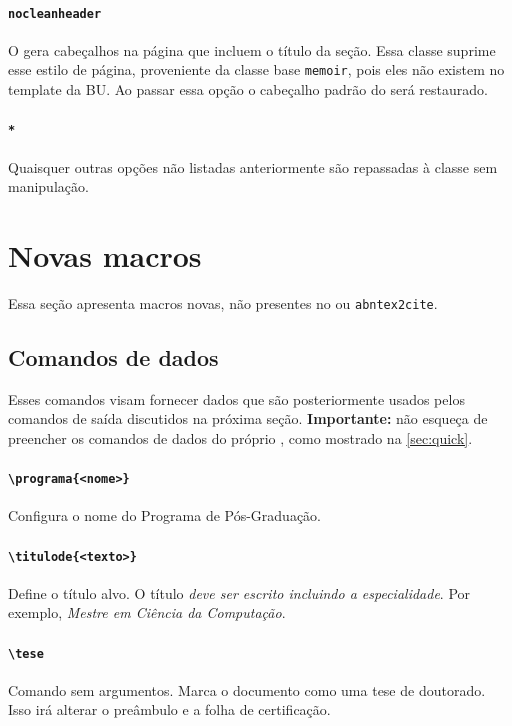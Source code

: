 \documentclass[embeddedlogo]{../ufsc-thesis-rn46-2019}
\begin{document}
\paragraph*{\texttt{nocleanheader}} O \abnTeX{} gera cabeçalhos na página que
incluem o título da seção. Essa classe suprime esse estilo de página,
proveniente da classe base \texttt{memoir}, pois eles não existem no template
da BU. Ao passar essa opção o cabeçalho padrão do \abnTeX{} será restaurado.

\paragraph*{\texttt{*}} Quaisquer outras opções não listadas anteriormente são
repassadas à classe \abnTeX{} sem manipulação.

\section{Novas macros}

Essa seção apresenta macros novas, não presentes no \abnTeX{} ou
\texttt{abntex2cite}.

\subsection{Comandos de dados}
\label{sec:dados}

Esses comandos visam fornecer dados que são posteriormente usados pelos
comandos de saída discutidos na próxima seção. \textbf{Importante:} não esqueça
de preencher os comandos de dados do próprio \abnTeX, como mostrado na
\autoref{sec:quick}.

\paragraph*{\texttt{\textbackslash{}programa\{<nome>\}}} Configura o nome do
Programa de Pós-Graduação.

\paragraph*{\texttt{\textbackslash{}titulode\{<texto>\}}} Define o título alvo.
O título \textit{deve ser escrito incluindo a especialidade}. Por exemplo,
\emph{Mestre em Ciência da Computação}.

\paragraph*{\texttt{\textbackslash{}tese}} Comando sem argumentos. Marca o
documento como uma tese de doutorado. Isso irá alterar o preâmbulo e a folha de
certificação.
\end{document}
